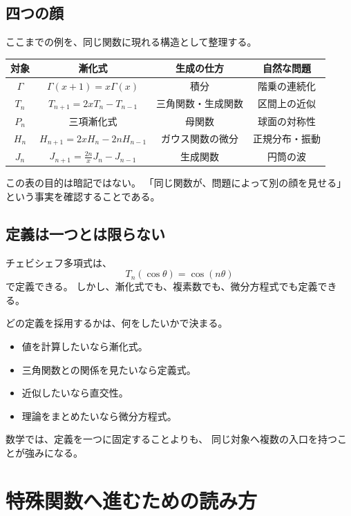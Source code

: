 \subsection{四つの顔}

ここまでの例を、同じ関数に現れる構造として整理する。

\begin{center}
\begin{tabular}{c|c|c|c}
  対象 & 漸化式 & 生成の仕方 & 自然な問題\\ \hline
  $\Gamma$ & $\Gamma(x+1)=x\Gamma(x)$
    & 積分 & 階乗の連続化\\
  $T_n$ & $T_{n+1}=2xT_n-T_{n-1}$
    & 三角関数・生成関数 & 区間上の近似\\
  $P_n$ & 三項漸化式
    & 母関数 & 球面の対称性\\
  $H_n$ & $H_{n+1}=2xH_n-2nH_{n-1}$
    & ガウス関数の微分 & 正規分布・振動\\
  $J_n$ & $J_{n+1}=\frac{2n}{x}J_n-J_{n-1}$
    & 生成関数 & 円筒の波\\
\end{tabular}
\end{center}

この表の目的は暗記ではない。
「同じ関数が、問題によって別の顔を見せる」という事実を確認することである。

\subsection{定義は一つとは限らない}

チェビシェフ多項式は、
\[
  T_n(\cos\theta)=\cos(n\theta)
\]
で定義できる。
しかし、漸化式でも、複素数でも、微分方程式でも定義できる。

どの定義を採用するかは、何をしたいかで決まる。

\begin{itemize}
  \item 値を計算したいなら漸化式。
  \item 三角関数との関係を見たいなら定義式。
  \item 近似したいなら直交性。
  \item 理論をまとめたいなら微分方程式。
\end{itemize}

数学では、定義を一つに固定することよりも、
同じ対象へ複数の入口を持つことが強みになる。

\section{特殊関数へ進むための読み方}

